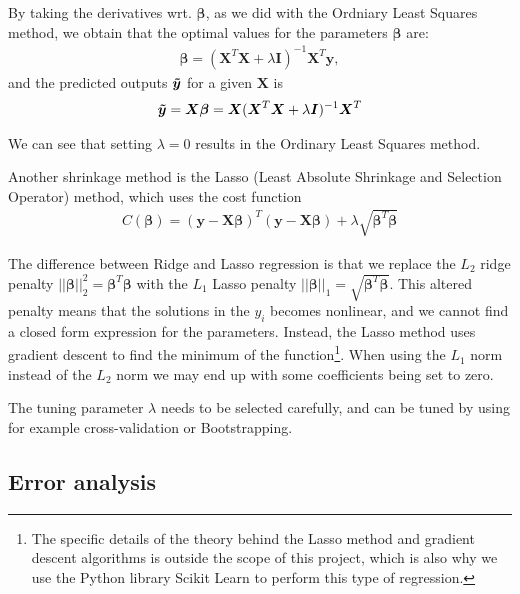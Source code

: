 By taking the derivatives wrt. $\boldsymbol{\beta}$, as we did with the Ordniary Least Squares method, we obtain that the optimal values for the parameters $\boldsymbol{\beta}$ are:
\begin{align}
    \label{eq:betaoptridge}
    \boldsymbol{\beta} = ( \boldsymbol{X}^T\boldsymbol{X} + \lambda \boldsymbol{I} )^{-1} \boldsymbol{X}^T \boldsymbol{y},
\end{align}
and the predicted outputs $\boldsymbol{\Tilde{y}}$ for a given  $\boldsymbol{X}$ is
\begin{align}
    \boldsymbol{\Tilde{y}} = \boldsymbol{X\beta} = \boldsymbol{X}(\boldsymbol{X}^T\boldsymbol{X}  + \lambda \boldsymbol{I})^{-1}\boldsymbol{X}^T
\end{align}

We can see that setting $\lambda=0$ results in the Ordinary Least Squares method.

Another shrinkage method is the Lasso (Least Absolute Shrinkage and Selection Operator) method, which uses the cost function\cite[p. 219]{james}
\begin{align}
    C(\boldsymbol{\beta}) = (\boldsymbol{y} - \boldsymbol{X\beta})^T(\boldsymbol{y} - \boldsymbol{X\beta}) + \lambda \sqrt{\boldsymbol{\beta}^T\boldsymbol{\beta}}
\end{align}

The difference between Ridge and Lasso regression is that we replace the $L_2$ ridge penalty $||\boldsymbol{\beta}||_2^2 = \boldsymbol{\beta}^T\boldsymbol{\beta}$ with the $L_1$ Lasso penalty $||\boldsymbol{\beta}||_1 = \sqrt{\boldsymbol{\beta}^T\boldsymbol{\beta}}$. This altered penalty means that the solutions in the $y_i$ becomes nonlinear, and we cannot find a closed form expression for the parameters. Instead, the Lasso method uses gradient descent to find the minimum of the function\footnote{The specific details of the theory behind the Lasso method and gradient descent algorithms is outside the scope of this project, which is also why we use the Python library Scikit Learn to perform this type of regression.}. When using the $L_1$ norm instead of the $L_2$ norm we may end up with some coefficients being set to zero.

The tuning parameter $\lambda$ needs to be selected carefully, and can be tuned by using for example cross-validation or Bootstrapping.

\subsection{Error analysis}

